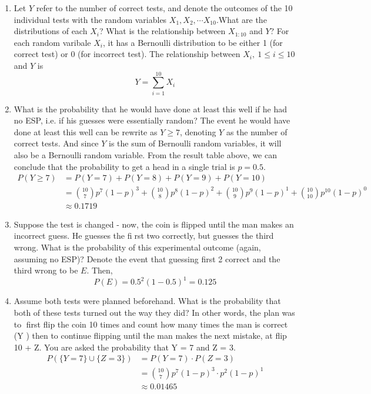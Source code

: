 \documentclass[preprint,12pt]{elsarticle}
\begin{document}
    \begin{enumerate}[label=\alph*]
    \item Let $Y$ refer to the number of correct tests, and denote the outcomes of the 10 individual tests
    with the random variables $X_1,X_2, \cdots X_10$.What are the distributions of each $X_i$? What is the 
    relationship between $X_{1:10}$ and $Y$?
    For each random varibale $X_i$, it has a Bernoulli distribution to be either 1 (for correct test) or 0
    (for incorrect test). The relationship between $X_i,\ 1\leq i\leq 10$ and $Y$ is 
    \begin{equation*}
        Y = \sum_{i=1}^{10} X_i
    \end{equation*}

    \item What is the probability that he would have done at least this well if he had no ESP, i.e. if his guesses
    were essentially random?
    The event he would have done at least this well can be rewrite as $Y \geq 7$, denoting $Y$ as the number of 
    correct tests. And since $Y$ is the sum of Bernoulli random variables, it will also be a Bernoulli random variable.
    From the result table above, we can conclude that the probability to get a head in a single trial is $p = 0.5$.
    \begin{align*}
        P(Y \geq 7)     &= P(Y=7) + P(Y=8) + P(Y=9) + P(Y=10) \\
                        &= \binom{10}{7}p^7(1-p)^3 + \binom{10}{8}p^8(1-p)^2
                           + \binom{10}{9}p^9(1-p)^1 + \binom{10}{10}p^10(1-p)^0 \\
                        &\approx 0.1719
    \end{align*}

    \item Suppose the test is changed - now, the coin is flipped until the man makes an incorrect guess.
    He guesses the first two correctly, but guesses the third wrong. What is the probability of this
    experimental outcome (again, assuming no ESP)?
    Denote the event that guessing first 2 correct and the third wrong to be $E$. Then,
    \begin{equation*}
        P(E) = 0.5^2 (1-0.5)^1 = 0.125
    \end{equation*}

    \item Assume both tests were planned beforehand. What is the probability that both of these tests turned
    out the way they did? In other words, the plan was to first flip the coin 10 times and count how many times 
    the man is correct (Y ) then to continue flipping until the man makes the next mistake, at flip 10 + Z. 
    You are asked the probability that Y = 7 and Z = 3.
    \begin{align*}
        P(\{Y=7\}\cup \{Z=3\})  &= P(Y=7) \cdot P(Z=3) \\
                            &= \binom{10}{7}p^7(1-p)^3 \cdot p^2 (1-p)^1 \\
                            &\approx 0.01465
    \end{align*}
    \end{enumerate}

    
\end{document}
